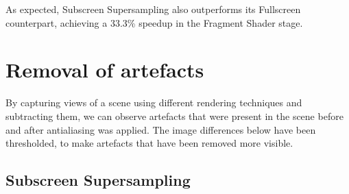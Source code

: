 \documentclass[12pt,a4paper,twoside,openright]{report}
\begin{document}
As expected, Subscreen Supersampling also outperforms its Fullscreen counterpart, achieving a 33.3\% speedup in the Fragment Shader stage. 

\clearpage
\section{Removal of artefacts}
By capturing views of a scene using different rendering techniques and subtracting them, we can observe artefacts that were present in the scene before and after antialiasing was applied. The image differences below have been thresholded, to make artefacts that have been removed more visible. 

\subsection{Subscreen Supersampling}
\end{document}
